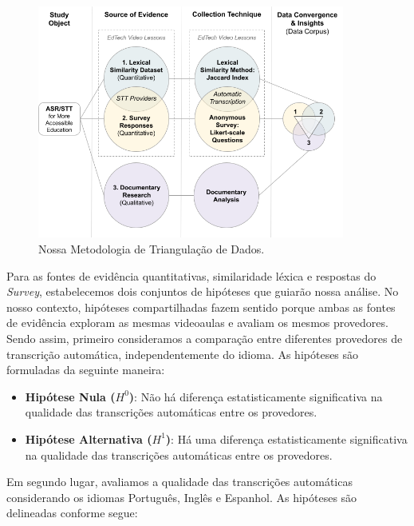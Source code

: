 \begin{figure}[htb]
\centering
\caption{Nossa Metodologia de Triangulação de Dados.}
\label{fig:chapter4-cs1-triangulation-methodology}
\includegraphics[width=0.9\textwidth]{images/chapter4-cs1-triangulation-methodology.png}
\end{figure}

Para as fontes de evidência quantitativas, similaridade léxica e respostas do \textit{Survey}, estabelecemos dois conjuntos de hipóteses que guiarão nossa análise. No nosso contexto, hipóteses compartilhadas fazem sentido porque ambas as fontes de evidência exploram as mesmas videoaulas e avaliam os mesmos provedores. Sendo assim, primeiro consideramos a comparação entre diferentes provedores de transcrição automática, independentemente do idioma. As hipóteses são formuladas da seguinte maneira:

\begin{itemize}
\item \textbf{Hipótese Nula ($H^0$)}: Não há diferença estatisticamente significativa na qualidade das transcrições automáticas entre os provedores.
\item \textbf{Hipótese Alternativa ($H^1$)}: Há uma diferença estatisticamente significativa na qualidade das transcrições automáticas entre os provedores.
\end{itemize}

Em segundo lugar, avaliamos a qualidade das transcrições automáticas considerando os idiomas Português, Inglês e Espanhol. As hipóteses são delineadas conforme segue:

